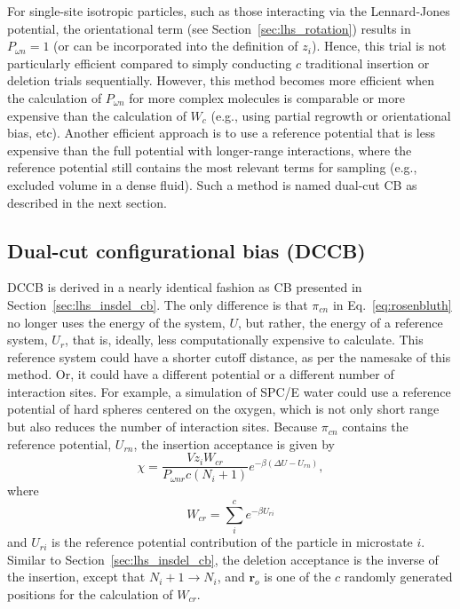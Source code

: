 \documentclass[
  9pt,
  bestpractices,
]{livecoms}
\begin{document}
For single-site isotropic particles, such as those interacting via the Lennard-Jones potential, the orientational term (see Section~\ref{sec:lhs_rotation}) results in $P_{\omega n} = 1$ (or can be incorporated into the definition of $z_i$). Hence, this trial is not particularly efficient compared to simply conducting $c$ traditional insertion or deletion trials sequentially.
However, this method becomes more efficient when the calculation of $P_{\omega n}$ for more complex molecules is comparable or more expensive than the calculation of $W_{c}$ (e.g., using partial regrowth or orientational bias, etc).
Another efficient approach is to use a reference potential that is less expensive than the full potential with longer-range interactions, where the reference potential still contains the most relevant terms for sampling (e.g., excluded volume in a dense fluid).
Such a method is named dual-cut CB \cite{vlugt_improving_1998} as described in the next section.

\subsection{\label{sec:lhs_insdel_dccb}Dual-cut configurational bias (DCCB)}

DCCB \cite{vlugt_improving_1998} is derived in a nearly identical fashion as CB presented in Section~\ref{sec:lhs_insdel_cb}.
The only difference is that $\pi_{cn}$ in Eq.~\ref{eq:rosenbluth} no longer uses the energy of the system, $U$, but rather, the energy of a reference system, $U_{r}$, that is, ideally, less computationally expensive to calculate.
This reference system could have a shorter cutoff distance, as per the namesake of this method.
Or, it could have a different potential or a different number of interaction sites.
For example, a simulation of SPC/E water could use a reference potential of hard spheres centered on the oxygen, which is not only short range but also reduces the number of interaction sites.
Because $\pi_{cn}$ contains the reference potential, $U_{rn}$, the insertion acceptance is given by
\begin{equation}
\chi = \frac{Vz_i W_{{c}r}}{P_{\omega nr}{c}(N_i+1)}e^{-\beta(\Delta U - U_{rn})},
\label{eq:lhs_ins_dccb}
\end{equation}
where
\begin{equation}
W_{{c}r}=\sum_{i}^{c} e^{-\beta U_{ri}}
\label{eq:wcr}
\end{equation}
and $U_{ri}$ is the reference potential contribution of the particle in microstate $i$.
Similar to Section~\ref{sec:lhs_insdel_cb}, the deletion acceptance is the inverse of the insertion, except that $N_i+1 \rightarrow N_i$, and $\mathbf{r}_o$ is one of the $c$ randomly generated positions for the calculation of $W_{{c}r}$.
\end{document}
